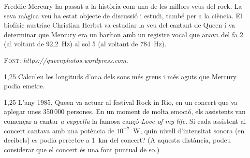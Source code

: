 Freddie Mercury ha passat a la història com una de les millors veus del rock. La seva màgica veu ha estat objecte de discussió i estudi, també per a la ciència. El biofísic austríac Christian Herbst va estudiar la veu del cantant de Queen i va determinar que Mercury era un baríton amb un registre vocal que anava del fa 2 (al voltant de 92,2~Hz) al sol 5 (al voltant de 784~Hz).

{\centering\small\textsc{Font:} \textit{https://queenphotos.wordpress.com}.\par}

\begin{apartat}{1,25}
Calculeu les longituds d'ona dels sons més greus i més aguts que Mercury podia emetre.
\end{apartat}

\begin{apartat}{1,25}
L'any 1985, Queen va actuar al festival Rock in Rio, en un concert que va aplegar unes 350\,000 persones. En un moment de molta emoció, els assistents van començar a cantar \textit{a cappella} la famosa cançó \textit{Love of my life}. Si cada assistent al concert cantava amb una potència de $10^{-7}$~W, quin nivell d'intensitat sonora (en decibels) es podia percebre a 1~km del concert? (A aquesta distància, podeu considerar que el concert és una font puntual de so.)
\end{apartat}

